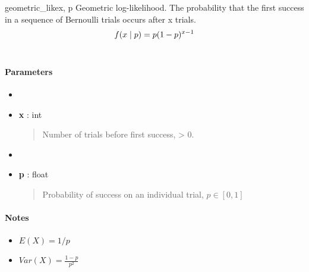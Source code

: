 \hypertarget{pymc.distributions.geometric_like}{}\begin{funcdesc}{geometric\_like}{x, p}
Geometric log-likelihood. The probability that the first success in a
sequence of Bernoulli trials occurs after x trials.
\begin{gather}
\begin{split}f(x \mid p) = p(1-p)^{x-1}\end{split}\notag\\\begin{split}\end{split}\notag
\end{gather}
\paragraph{Parameters}
\begin{itemize}
\item[] \item[] \textbf{x} : int
\begin{quote}

Number of trials before first success, \textgreater{} 0.
\end{quote}

\item[] \item[] \textbf{p} : float
\begin{quote}

Probability of success on an individual trial, $p \in [0,1]$
\end{quote}
\end{itemize}
\paragraph{Notes}
\begin{itemize}
\item {} 
$E(X)=1/p$

\item {} 
$Var(X)=\frac{1-p}{p^2}$

\end{itemize}
\end{funcdesc}

